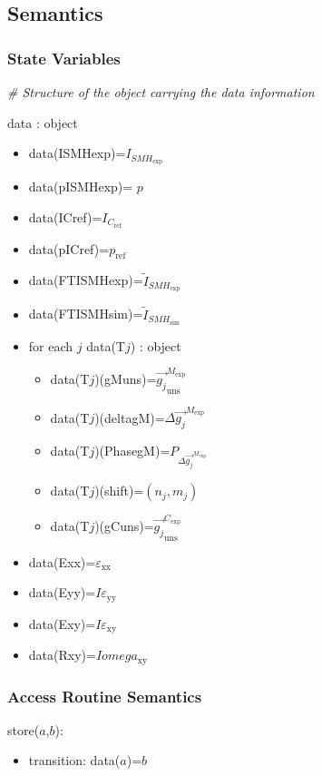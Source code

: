 \documentclass[12pt, titlepage]{article}
\begin{document}
\subsection{Semantics}

\subsubsection{State Variables}

\noindent\textit{{\#} Structure of the object carrying the data information}\medskip

data : object
\begin{itemize}
\item data(ISMHexp)=$I_{\mathit{SMH}_{\text{exp}}}$
\item data(pISMHexp)= $p$
\item data(ICref)=$I_{\mathit{C}_{\text{ref}}}$
\item data(pICref)=$p_{\text{ref}}$
\item data(FTISMHexp)=$\widetilde{I}_{\mathit{SMH}_{\text{exp}}}$
\item data(FTISMHsim)=$\widetilde{I}_{\mathit{SMH}_{\text{sim}}}$
\item for each $j$ data(T$j$) : object 
	\begin{itemize}
	\item data(T$j$)(gMuns)=$\overrightarrow{g_{j}}_{\text{uns}}^{M_{\text{exp}}}$
	\item data(T$j$)(deltagM)=$\Delta \overrightarrow{g_{j}}^{M_{\text{exp}}}$
	\item data(T$j$)(PhasegM)=$P_{\Delta \overrightarrow{g_{j}}^{M_{\text{exp}}}}$
	\item data(T$j$)(shift)=$(n_j,m_j)$
	\item data(T$j$)(gCuns)=$\overrightarrow{g_{j}}_{\text{uns}}^{C_{\text{exp}}}$
	\end{itemize}
\item data(Exx)=$\varepsilon_{\text{xx}}$
\item data(Eyy)=$I\varepsilon_{\text{yy}}$
\item data(Exy)=$I\varepsilon_{\text{xy}}$
\item data(Rxy)=$Iomega_{\text{xy}}$
\end{itemize}

\subsubsection{Access Routine Semantics}

\noindent store($a$,$b$):
\begin{itemize}
\item transition: data($a$)=$b$
\end{itemize}
\end{document}
